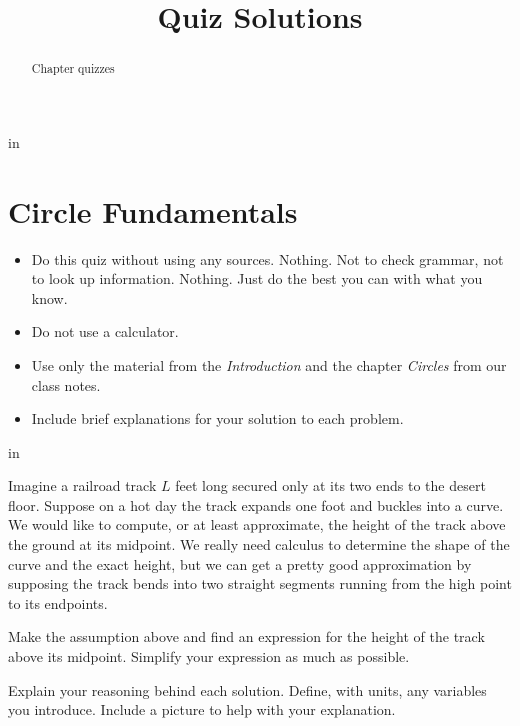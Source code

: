 \documentclass{ximera}
\title{Quiz Solutions}
\newcommand{\pskip}{\vskip 0.1 in}
\begin{document}
\begin{abstract}
Chapter quizzes
\end{abstract}
\maketitle


\pskip

\section*{Circle Fundamentals}

\begin{itemize}

\item{Do this quiz without using any sources. Nothing. Not to check grammar, not to look up information. Nothing. Just do the best you can with what you know.}

\item{Do not use a calculator.}

\item{Use only the material from the \emph{Introduction} and the chapter \emph{Circles} from our class notes.}

\item{Include brief explanations for your solution to each problem.}

\end{itemize}


\pskip

\begin{question}  \label{Q:9444433331350}
Imagine a railroad track $L$ feet long secured only at its two ends to the desert floor. Suppose on a hot day the track expands one foot and buckles into a curve. We would like to compute, or at least approximate, the height of the track above the ground at its midpoint. We really need calculus to determine the shape of the curve and the exact height, but we can get a pretty good approximation by supposing the track bends into two straight segments running from the high point to its endpoints.

Make the assumption above and find an expression for the height of the track above its midpoint. Simplify your expression as much as possible. 

Explain your reasoning behind each solution. Define, with units, any variables you introduce. Include a picture to help with your explanation.

\end{question}
\end{document}
